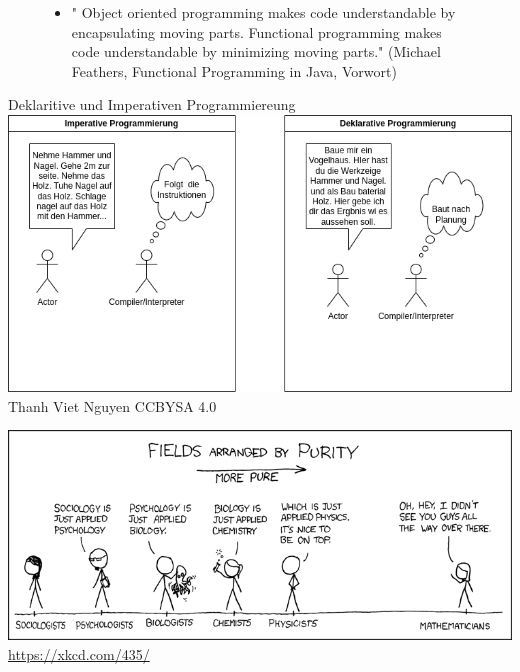 \documentclass{beamer}
\begin{document}
\begin{frame}
\begin{figure}
    \begin{itemize}
    \item \textmd{" Object oriented programming makes code understandable by encapsulating moving parts.
Functional programming makes code understandable by minimizing moving parts." (Michael Feathers, Functional Programming in Java, Vorwort)}
    \end{itemize}
\end{figure}
\end{frame}

\begin{frame}{Deklaritive und Imperativen Programmiereung}
\centering
\includegraphics[scale=0.38]{bilder/ProgrammierParadigmen.drawio.png} 
\\
\textmd{\tiny Thanh Viet Nguyen CCBYSA 4.0}
\end{frame}

\begin{frame}
	\centering
	\includegraphics[scale=0.35]{bilder/purity.png}
    \textmd{\url{https://xkcd.com/435/}}
\end{frame}
\end{document}

